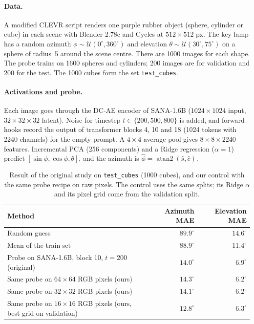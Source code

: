 \documentclass[10pt]{article}
\newcommand{\degr}{^\circ}
\begin{document}
\paragraph{Data.}
A modified CLEVR script renders one purple rubber object (sphere, cylinder or cube) in each scene with Blender 2.78c and Cycles at $512\times512$ px.
The key lamp has a random azimuth $\phi\sim\mathcal{U}(0\degr,360\degr)$ and elevation $\theta\sim\mathcal{U}(30\degr,75\degr)$ on a sphere of radius~5 around the scene centre.
There are 1000 images for each shape.
The probe trains on 1600 spheres and cylinders; 200 images are for validation and 200 for the test.
The 1000 cubes form the set \texttt{test\_cubes}.

\paragraph{Activations and probe.}
Each image goes through the DC-AE encoder of SANA-1.6B ($1024\times1024$ input, $32\times32\times32$ latent).
Noise for timestep $t\in\{200,500,800\}$ is added, and forward hooks record the output of transformer blocks 4, 10 and 18 (1024 tokens with 2240 channels) for the empty prompt.
A $4\times4$ average pool gives $8\times8\times2240$ features.
Incremental PCA (256 components) and a Ridge regression ($\alpha=1$) predict $[\sin\phi,\cos\phi,\theta]$, and the azimuth is $\hat\phi=\operatorname{atan2}(\hat s,\hat c)$.

\begin{table}[t]
\centering
\caption{Result of the original study on \texttt{test\_cubes} (1000 cubes), and our control with the same probe recipe on raw pixels. The control uses the same splits; its Ridge $\alpha$ and its pixel grid come from the validation split.}
\label{tab:original}
\begin{tabular}{lrr}
\toprule
Method & Azimuth MAE & Elevation MAE \\
\midrule
Random guess & $89.9\degr$ & $14.6\degr$ \\
Mean of the train set & $88.9\degr$ & $11.4\degr$ \\
Probe on SANA-1.6B, block 10, $t=200$ (original) & $14.0\degr$ & $6.9\degr$ \\
Same probe on $64\times64$ RGB pixels (ours) & $14.3\degr$ & $6.2\degr$ \\
Same probe on $32\times32$ RGB pixels (ours) & $14.1\degr$ & $6.2\degr$ \\
Same probe on $16\times16$ RGB pixels (ours, best grid on validation) & $12.8\degr$ & $6.3\degr$ \\
\bottomrule
\end{tabular}
\end{table}
\end{document}
